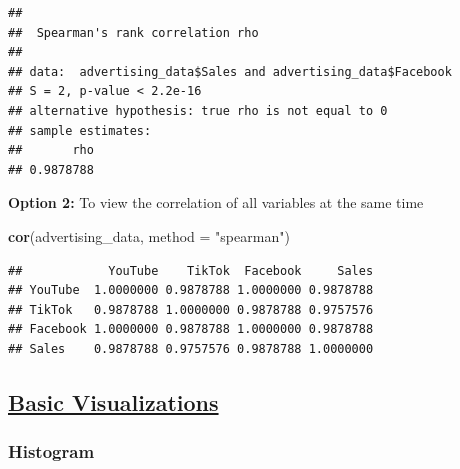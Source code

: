 \documentclass[
]{article}
\newenvironment{Shaded}{\begin{snugshade}}{\end{snugshade}}
\newcommand{\AttributeTok}[1]{\textcolor[rgb]{0.13,0.29,0.53}{#1}}
\newcommand{\FunctionTok}[1]{\textcolor[rgb]{0.13,0.29,0.53}{\textbf{#1}}}
\newcommand{\NormalTok}[1]{#1}
\newcommand{\SpecialCharTok}[1]{\textcolor[rgb]{0.81,0.36,0.00}{\textbf{#1}}}
\newcommand{\StringTok}[1]{\textcolor[rgb]{0.31,0.60,0.02}{#1}}
\begin{document}
\begin{Shaded}
\end{Shaded}

\begin{verbatim}
## 
##  Spearman's rank correlation rho
## 
## data:  advertising_data$Sales and advertising_data$Facebook
## S = 2, p-value < 2.2e-16
## alternative hypothesis: true rho is not equal to 0
## sample estimates:
##       rho 
## 0.9878788
\end{verbatim}

\textbf{Option 2:} To view the correlation of all variables at the same
time

\begin{Shaded}
\begin{Highlighting}[]
\FunctionTok{cor}\NormalTok{(advertising\_data, }\AttributeTok{method =} \StringTok{"spearman"}\NormalTok{)}
\end{Highlighting}
\end{Shaded}

\begin{verbatim}
##            YouTube    TikTok  Facebook     Sales
## YouTube  1.0000000 0.9878788 1.0000000 0.9878788
## TikTok   0.9878788 1.0000000 0.9878788 0.9757576
## Facebook 1.0000000 0.9878788 1.0000000 0.9878788
## Sales    0.9878788 0.9757576 0.9878788 1.0000000
\end{verbatim}

\subsection{\texorpdfstring{\ul{\textbf{Basic
Visualizations}}}{Basic Visualizations}}\label{basic-visualizations}

\subsubsection{\texorpdfstring{\textbf{Histogram}}{Histogram}}\label{histogram}
\end{document}
